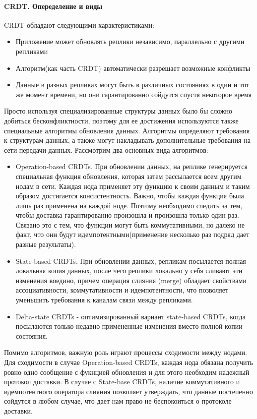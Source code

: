 \paragraph{CRDT. Опеределение и виды}
CRDT обладают следующими характеристиками:
\begin{itemize}
    \item Приложение может обновлять реплики независимо, параллельно с другими репликами
    \item Алгоритм(как часть CRDT) автоматически разрешает возможные конфликты
    \item Данные в разных репликах могут быть в различных состояниях в один и тот же момент времени, но они гарантированно сойдутся спустя некоторое время 
\end{itemize}
Просто используя специализированные структуры данных было бы сложно добиться бесконфликтности, поэтому для ее достижения используются также специальные алгоритмы обновления данных. Алгоритмы определяют требования к структурам данных, а также могут накладывать дополнительные требования на сети передачи данных. Рассмотрим два основных вида алгоритмов:
\begin{itemize}
    \item Operation-based CRDTs. При обновлении данных, на реплике генерируется специальная функция обновления, которая затем рассылается всем другим нодам в сети. Каждая нода применяет эту функцию к своим данным и таким образом достигается консистентность. Важно, чтобы каждая функция была лишь раз применена на каждой ноде. Поэтому необходимо следить за тем, чтобы доставка гарантированно произошла и произошла только один раз. Связано это с тем, что функции могут быть коммутативными, но далеко не факт, что они будут идемпотентными(применение несколько раз подряд дает разные результаты).
    \item State-based CRDTs. При обновлении данных, репликам посылается полная локальная копия данных, после чего реплики локально у себя сливают эти изменения воедино, причем операция слияния (merge) обладает свойствами ассоциативности, коммутативности и идемпотентности, что позволяет уменьшить требования к каналам связи между репликами. 
    \item Delta-state CRDTs - оптимизированный вариант state-based CRDTs, когда посылаются только недавно примененные изменения вместо полной копии состояния.
\end{itemize}
Помимо алгоритмов, важную роль играют процессы сходимости между нодами. Для сходимости в случае Operation-based CRDTs, каждая нода обязана получить ровно одно сообщение с фукнцией обновления и для этого необходим надежный протокол доставки. В случае с State-base CRDTs, наличие коммутативного и идемпотентного оператора слияния позволяет утверждать, что данные постепенно сойдутся в любом случае, что дает нам право не беспокоиться о протоколе доставки. 
